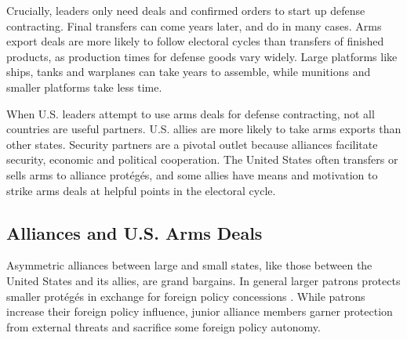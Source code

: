 \documentclass[12pt]{article}
\begin{document}
Crucially, leaders only need deals and confirmed orders to start up defense contracting. 
Final transfers can come years later, and do in many cases. 
Arms export deals are more likely to follow electoral cycles than transfers of finished products, as production times for defense goods vary widely. 
Large platforms like ships, tanks and warplanes can take years to assemble, while munitions and smaller platforms take less time. 



When U.S. leaders attempt to use arms deals for defense contracting, not all countries are useful partners. 
U.S. allies are more likely to take arms exports than other states. 
Security partners are a pivotal outlet because alliances facilitate security, economic and political cooperation.
The United States often transfers or sells arms to alliance prot{\'e}g{\'e}s, and some allies have means and motivation to strike arms deals at helpful points in the electoral cycle. 



\subsection{Alliances and U.S. Arms Deals}


Asymmetric alliances between large and small states, like those between the United States and its allies, are grand bargains.
In general larger patrons protects smaller prot{\'e}g{\'e}s in exchange for foreign policy concessions \citep{Morrow1991}.
While patrons increase their foreign policy influence, junior alliance members garner protection from external threats and sacrifice some foreign policy autonomy.


\end{document}

